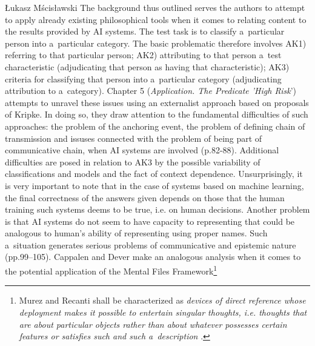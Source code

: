 \begin{newrevengenv}{Łukasz Mścisławski}
The background thus outlined serves the authors to attempt to apply already existing philosophical tools when it comes to relating content to the results provided by AI systems. The test task is to classify a~particular person into a~particular category. The basic problematic therefore involves AK1) referring to that particular person; AK2) attributing to that person a~test characteristic (adjudicating that person as having that characteristic); AK3) criteria for classifying that person into a~particular category (adjudicating attribution to a~category). Chapter 5 (\textit{Application. The Predicate 'High Risk}') attempts to unravel these issues using an externalist approach based on proposals of Kripke. In doing so, they draw attention to the fundamental difficulties of such approaches: the problem of the anchoring event, the problem of defining chain of transmission and issuses connected with the problem of being part of communicative chain, when AI systems are involved (p.82-88). Additional difficulties are posed in relation to AK3 by the possible variability of classifications and models and the fact of context dependence. Unsurprisingly, it is very important to note that in the case of systems based on machine learning, the final correctness of the answers given depends on those that the human training such systems deems to be true, i.e. on human decisions. Another problem is that AI systems do not seem to have capacity to representing that could be analogous to human's ability of representing using proper names. Such a~situation generates serious problems of communicative and epistemic nature (pp.99--105). Cappalen and Dever make an analogous analysis when it comes to the potential application of the Mental Files Framework\footnote{Murez and Recanti shall be characterized as \textit{devices of direct reference whose deployment makes it possible to entertain singular thoughts, i.e. thoughts that are about particular objects rather than about whatever possesses certain features or satisfies such and such a~description}
\parencite[cf.][p.267]{murez_mental_2016}.%
}
\end{newrevengenv}
